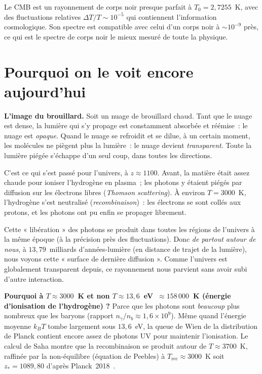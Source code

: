 \documentclass[11pt,a4paper,openany]{report}
\begin{document}
\begin{tcolorbox}[mathspe]
Le CMB est un rayonnement de corps noir presque parfait à
$T_{0} = 2{,}7255$~K, avec des fluctuations relatives $\Delta T/T \sim 10^{-5}$
qui contiennent l'information cosmologique. Son spectre est compatible avec
celui d'un corps noir à $\sim 10^{-9}$ près, ce qui est le spectre de corps
noir le mieux mesuré de toute la physique.
\end{tcolorbox}

\section{Pourquoi on le voit encore aujourd'hui}

\begin{tcolorbox}[vulgarisation]
\textbf{L'image du brouillard.} Soit un nuage de brouillard chaud. Tant que
le nuage est dense, la lumière qui s'y propage est constamment absorbée et
réémise~: le nuage est \emph{opaque}. Quand le nuage se refroidit et se
dilue, à un certain moment, les molécules ne piègent plus la lumière~: le
nuage devient \emph{transparent}. Toute la lumière piégée s'échappe d'un seul
coup, dans toutes les directions.

\medskip
C'est ce qui s'est passé pour l'univers, à $z \approx 1100$. Avant, la
matière était assez chaude pour ioniser l'hydrogène en plasma~; les photons
y étaient piégés par diffusion sur les électrons libres (\emph{Thomson
scattering}). À environ $T = 3000$~K, l'hydrogène s'est neutralisé
(\emph{recombinaison})~: les électrons se sont collés aux protons, et les
photons ont pu enfin se propager librement.

\medskip
Cette « libération » des photons se produit dans toutes les régions de
l'univers à la même époque (à la précision près des fluctuations). Donc
\emph{de partout autour de nous}, à $13{,}79$~milliards d'années-lumière (en
distance de trajet de la lumière), nous voyons cette « surface de dernière
diffusion ». Comme l'univers est globalement transparent depuis, ce
rayonnement nous parvient sans avoir subi d'autre interaction.
\end{tcolorbox}

\begin{tcolorbox}[mathspe]
\textbf{Pourquoi à $T \approx 3000$~K et non $T \approx 13{,}6$~eV~$\approx 158\,000$~K
(énergie d'ionisation de l'hydrogène) ?} Parce que les photons sont
\emph{beaucoup} plus nombreux que les baryons (rapport $n_{\gamma}/n_b \approx
1{,}6\times 10^{9}$). Même quand l'énergie moyenne $k_B T$ tombe largement
sous $13{,}6$~eV, la queue de Wien de la distribution de Planck contient
encore assez de photons UV pour maintenir l'ionisation. Le calcul de Saha
montre que la recombinaison se produit autour de $T \approx 3700$~K, raffinée
par la non-équilibre (équation de Peebles) à $T_{\text{rec}} \approx 3000$~K
soit $z_{*} = 1089{,}80$ d'après Planck~2018~\cite{Planck2018}.
\end{tcolorbox}
\end{document}
